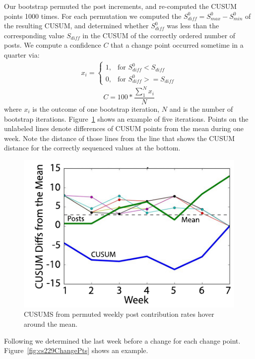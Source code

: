 Our bootstrap permuted the post increments, and re-computed the CUSUM
points 1000 times. For each permutation we computed the $S_{diff}^0 =
S_{max}^0-S_{min}^0$ of the resulting CUSUM, and determined whether
$S_{diff}^0$ was less than the corresponding value $S_{diff}$ in the
CUSUM of the correctly ordered number of posts. We compute a
confidence $C$ that a change point occurred sometime in a quarter via:
\begin{equation}
  \begin{split}
    x_i = \left.
    \begin{cases}
      1, & \mbox{for } S_{diff}^0 < S_{diff} \\
      0, & \mbox{for }S_{diff}^0 >= S_{diff}
    \end{cases}
    \right.
  \end{split}
\end{equation}
\begin{equation}
  \label{eqn:confidence}
  C = \left.
  100*\frac{\sum_1^N x_i}{N}
  \right.
\end{equation}
where $x_i$ is the outcome of one bootstrap iteration, $N$ and is the
number of bootstrap iterations. Figure~\ref{fig:multiBoots} shows an
example of five iterations. Points on the unlabeled lines denote
differences of CUSUM points from the mean during one week. Note the
distance of those lines from the line that shows the CUSUM distance
for the correctly sequenced values at the bottom.
\begin{figure}[htp]
       \centering
       \includegraphics{Figs/multiBootstrapCurvesUrbStud145Summer14.pdf}
       \caption{\textnormal{CUSUMS from permuted weekly post
           contribution rates hover around the mean.}}
       \label{fig:multiBoots}
\end{figure}
Following \cite{tayl16} we determined the last week before a change
for each change point. Figure~\ref{fig:cs229ChangePts} shows an
example.

